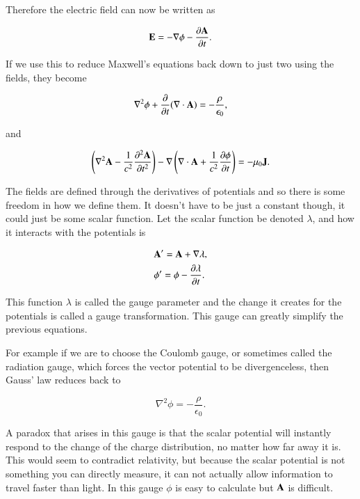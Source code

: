 \documentclass[preprint, review,12pt]{elsarticle}
\def\.{\cdot}
\def\b{\textbf}
\def\div{\nabla \.}
\def\lap{\nabla^2}
\def\9{\left(}
\def\0{\right)}
\newcommand{\pd}[2]{\frac{\partial #1 }{\partial #2}}
\newcommand{\pds}[2]{\frac{\partial^2 #1 }{\partial {#2}^2}}
\begin{document}
Therefore the electric field can now be written as

\begin{equation}
    \b E = -\nabla \phi - \pd{\b A}{t}.
\end{equation}

If we use this to reduce Maxwell's equations back down to just two using the fields, they become

\begin{equation}
    \lap \phi + \pd{}{t}(\div \b A) = -\frac{\rho}{\epsilon_0},
\end{equation}

and

\begin{equation}
    \9 \lap \b A - \frac{1}{c^2} \pds{\b A}{t} \0 - \nabla \9 \div \b A + \frac{1}{c^2} \pd{\phi}{t} \0 = -\mu_0 \b J.
\end{equation}

The fields are defined through the derivatives of potentials and so there is some freedom in how we define them. It doesn't have to be just a constant though, it could just be some scalar function. Let the scalar function be denoted $\lambda$, and how it interacts with the potentials is

\begin{equation}
\begin{split}
    & \b A' = \b A + \nabla \lambda, \\
    & \phi' = \phi - \pd{\lambda}{t}.
\end{split}
\end{equation}

This function $\lambda$ is called the gauge parameter and the change it creates for the potentials is called a gauge transformation. This gauge can greatly simplify the previous equations.

For example if we are to choose the Coulomb gauge, or sometimes called the radiation gauge, which forces the vector potential to be divergenceless, then Gauss' law reduces back to

\begin{equation}
    \lap \phi = -\frac{\rho}{\epsilon_0}.
\end{equation}

A paradox that arises in this gauge is that the scalar potential will instantly respond to the change of the charge distribution, no matter how far away it is. This would seem to contradict relativity, but because the scalar potential is not something you can directly measure, it can not actually allow information to travel faster than light. In this gauge $\phi$ is easy to calculate but $\b A$ is difficult. 
\end{document}
